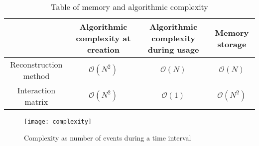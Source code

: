 \documentclass{report}
\begin{document}
	\begin{table}
		\begin{center}
			\begin{tabular}{|c|c|c|c|}
					\hline
												&	Algorithmic complexity at creation	&	Algorithmic complexity during usage	&	Memory storage		\\\hline
					Reconstruction method		&	$\mathscr{O}(N^2)$					&	$\mathscr{O}(N)$					&	$\mathscr{O}(N)$	\\\hline
					Interaction matrix			&	$\mathscr{O}(N^2)$					&	$\mathscr{O}(1)$					&	$\mathscr{O}(N^2)$	\\\hline
			\end{tabular}
		\end{center}
		\caption{Table of memory and algorithmic complexity}\label{tab:complexity}
	\end{table}
	\begin{landscape}
		\begin{figure}
			\centering
			\texttt{[image: complexity]}
			\caption{Complexity as number of events during a time interval}
		\end{figure}
	\end{landscape}
\end{document}
